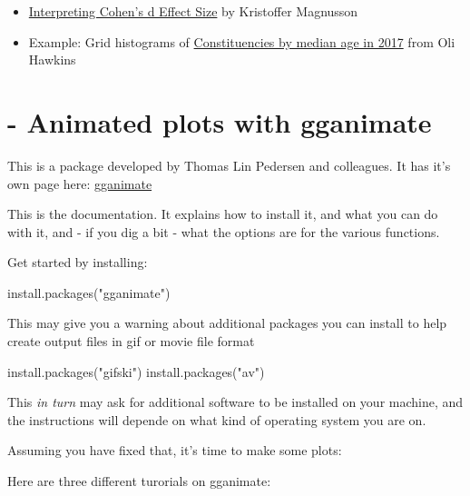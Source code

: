 \documentclass[
]{book}
\newenvironment{Shaded}{\begin{snugshade}}{\end{snugshade}}
\newcommand{\FunctionTok}[1]{\textcolor[rgb]{0.00,0.00,0.00}{#1}}
\newcommand{\NormalTok}[1]{#1}
\newcommand{\StringTok}[1]{\textcolor[rgb]{0.31,0.60,0.02}{#1}}
\providecommand{\tightlist}{%
  \setlength{\itemsep}{0pt}\setlength{\parskip}{0pt}}
\begin{document}
\begin{itemize}
\tightlist
\item
  \href{https://rpsychologist.com/d3/cohend/}{Interpreting Cohen's d Effect Size} by Kristoffer Magnusson
\item
  Example: Grid histograms of \href{https://olihawkins.com/visualisation/14}{Constituencies by median age in 2017} from Oli Hawkins
\end{itemize}

\hypertarget{animated-plots-with-gganimate}{%
\chapter*{- Animated plots with gganimate}\label{animated-plots-with-gganimate}}


This is a package developed by Thomas Lin Pedersen and colleagues. It has it's own page here:
\href{https://gganimate.com/}{gganimate}

This is the documentation. It explains how to install it, and what you can do with it, and - if you dig a bit - what the options are for the various functions.

Get started by installing:

\begin{Shaded}
\begin{Highlighting}[]
\FunctionTok{install.packages}\NormalTok{(}\StringTok{"gganimate"}\NormalTok{)}
\end{Highlighting}
\end{Shaded}

This may give you a warning about additional packages you can install to help create output files in gif or movie file format

\begin{Shaded}
\begin{Highlighting}[]
\FunctionTok{install.packages}\NormalTok{(}\StringTok{"gifski"}\NormalTok{)}
\FunctionTok{install.packages}\NormalTok{(}\StringTok{"av"}\NormalTok{)}
\end{Highlighting}
\end{Shaded}

This \emph{in turn} may ask for additional software to be installed on your machine, and the instructions will depende on what kind of operating system you are on.

Assuming you have fixed that, it's time to make some plots:

Here are three different turorials on gganimate:
\end{document}
